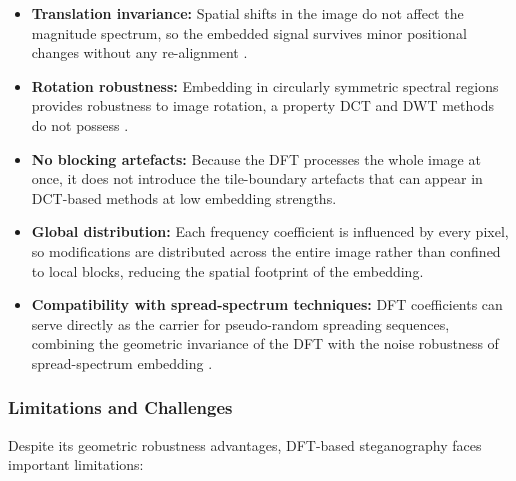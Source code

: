\documentclass[12pt,a4paper,oneside]{report}
\begin{document}
	\begin{itemize}
		\item \textbf{Translation invariance:} Spatial shifts in the image do not affect the
		magnitude spectrum, so the embedded signal survives minor positional changes without
		any re-alignment \cite{bracewell2000fourier}.
		\item \textbf{Rotation robustness:} Embedding in circularly symmetric spectral regions
		provides robustness to image rotation, a property DCT and DWT methods do not possess
		\cite{ruanaidh1998rotation, solachidis2001circularly}.
		\item \textbf{No blocking artefacts:} Because the DFT processes the whole image at once,
		it does not introduce the tile-boundary artefacts that can appear in DCT-based
		methods at low embedding strengths.
		\item \textbf{Global distribution:} Each frequency coefficient is influenced by every
		pixel, so modifications are distributed across the entire image rather than confined
		to local blocks, reducing the spatial footprint of the embedding.
		\item \textbf{Compatibility with spread-spectrum techniques:} DFT coefficients can serve
		directly as the carrier for pseudo-random spreading sequences, combining the
		geometric invariance of the DFT with the noise robustness of spread-spectrum
		embedding \cite{marvel1999spread}.
	\end{itemize}
	
	\subsubsection{Limitations and Challenges}
	
	Despite its geometric robustness advantages, DFT-based steganography faces important
	limitations:
	
\end{document}

